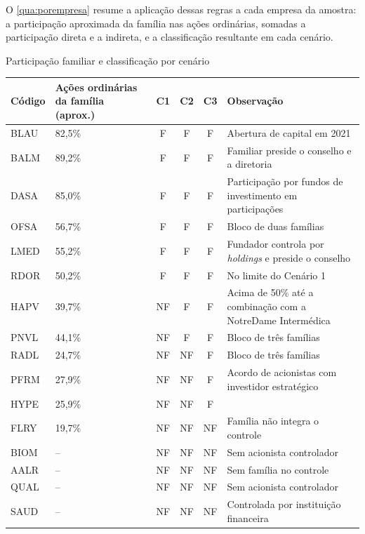 O \autoref{qua:porempresa} resume a aplicação dessas regras a cada empresa da
amostra: a participação aproximada da família nas ações ordinárias, somadas a
participação direta e a indireta, e a classificação resultante em cada cenário.

\begin{quadro}[htb]
\caption{Participação familiar e classificação por cenário}\label{qua:porempresa}
\centering\footnotesize
\begin{tabularx}{\textwidth}{|l|P{2.3cm}|c|c|c|L|}
\hline
\textbf{Código} & \textbf{Ações ordinárias da família (aprox.)} & \textbf{C1} & \textbf{C2} & \textbf{C3} & \textbf{Observação} \\ \hline
BLAU & 82,5\% & F & F & F & Abertura de capital em 2021 \\ \hline
BALM & 89,2\% & F & F & F & Familiar preside o conselho e a diretoria \\ \hline
DASA & 85,0\% & F & F & F & Participação por fundos de investimento em participações \\ \hline
OFSA & 56,7\% & F & F & F & Bloco de duas famílias \\ \hline
LMED & 55,2\% & F & F & F & Fundador controla por \textit{holdings} e preside o conselho \\ \hline
RDOR & 50,2\% & F & F & F & No limite do Cenário 1 \\ \hline
HAPV & 39,7\% & NF & F & F & Acima de 50\% até a combinação com a NotreDame Intermédica \\ \hline
PNVL & 44,1\% & NF & F & F & Bloco de três famílias \\ \hline
RADL & 24,7\% & NF & NF & F & Bloco de três famílias \\ \hline
PFRM & 27,9\% & NF & NF & F & Acordo de acionistas com investidor estratégico \\ \hline
HYPE & 25,9\% & NF & NF & F & \\ \hline
FLRY & 19,7\% & NF & NF & NF & Família não integra o controle \\ \hline
BIOM & -- & NF & NF & NF & Sem acionista controlador \\ \hline
AALR & -- & NF & NF & NF & Sem família no controle \\ \hline
QUAL & -- & NF & NF & NF & Sem acionista controlador \\ \hline
SAUD & -- & NF & NF & NF & Controlada por instituição financeira \\ \hline
\end{tabularx}
\end{quadro}

